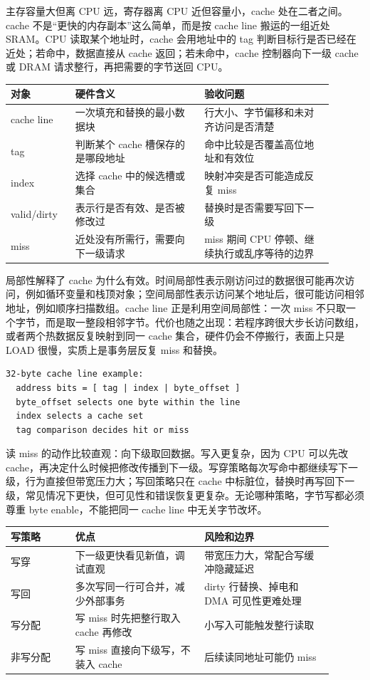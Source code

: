 主存容量大但离 CPU 远，寄存器离 CPU 近但容量小，cache 处在二者之间。cache 不是“更快的内存副本”这么简单，而是按 cache line 搬运的一组近处 SRAM。CPU 读取某个地址时，cache 会用地址中的 tag 判断目标行是否已经在近处；若命中，数据直接从 cache 返回；若未命中，cache 控制器向下一级 cache 或 DRAM 请求整行，再把需要的字节送回 CPU。

\begin{longtable}{L{0.18\linewidth}L{0.36\linewidth}L{0.36\linewidth}}
\toprule
对象 & 硬件含义 & 验收问题 \\
\midrule
cache line & 一次填充和替换的最小数据块 & 行大小、字节偏移和未对齐访问是否清楚 \\
tag & 判断某个 cache 槽保存的是哪段地址 & 命中比较是否覆盖高位地址和有效位 \\
index & 选择 cache 中的候选槽或集合 & 映射冲突是否可能造成反复 miss \\
valid/dirty & 表示行是否有效、是否被修改过 & 替换时是否需要写回下一级 \\
miss & 近处没有所需行，需要向下一级请求 & miss 期间 CPU 停顿、继续执行或乱序等待的边界 \\
\bottomrule
\end{longtable}

局部性解释了 cache 为什么有效。时间局部性表示刚访问过的数据很可能再次访问，例如循环变量和栈顶对象；空间局部性表示访问某个地址后，很可能访问相邻地址，例如顺序扫描数组。cache line 正是利用空间局部性：一次 miss 不只取一个字节，而是取一整段相邻字节。代价也随之出现：若程序跨很大步长访问数组，或者两个热数据反复映射到同一 cache 集合，硬件仍会不停搬行，表面上只是 LOAD 很慢，实质上是事务层反复 miss 和替换。

\begin{lstlisting}
32-byte cache line example:
  address bits = [ tag | index | byte_offset ]
  byte_offset selects one byte within the line
  index selects a cache set
  tag comparison decides hit or miss
\end{lstlisting}

读 miss 的动作比较直观：向下级取回数据。写入更复杂，因为 CPU 可以先改 cache，再决定什么时候把修改传播到下一级。写穿策略每次写命中都继续写下一级，行为直接但带宽压力大；写回策略只在 cache 中标脏位，替换时再写回下一级，常见情况下更快，但可见性和错误恢复更复杂。无论哪种策略，字节写都必须尊重 byte enable，不能把同一 cache line 中无关字节改坏。

\begin{longtable}{L{0.18\linewidth}L{0.36\linewidth}L{0.36\linewidth}}
\toprule
写策略 & 优点 & 风险和边界 \\
\midrule
写穿 & 下一级更快看见新值，调试直观 & 带宽压力大，常配合写缓冲隐藏延迟 \\
写回 & 多次写同一行可合并，减少外部事务 & dirty 行替换、掉电和 DMA 可见性更难处理 \\
写分配 & 写 miss 时先把整行取入 cache 再修改 & 小写入可能触发整行读取 \\
非写分配 & 写 miss 直接向下级写，不装入 cache & 后续读同地址可能仍 miss \\
\bottomrule
\end{longtable}

